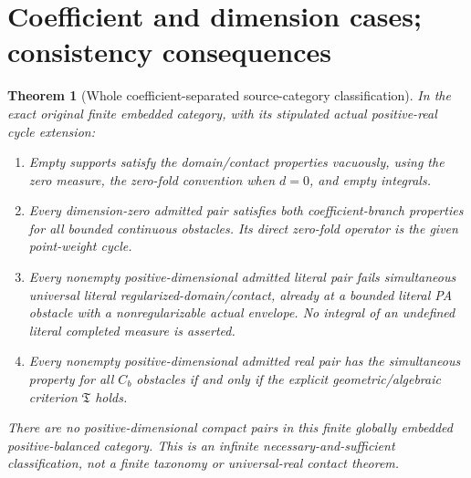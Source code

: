 \documentclass[11pt]{article}
\newtheorem{theorem}{Theorem}[section]
\begin{document}
\section{Coefficient and dimension cases; consistency consequences}
\begin{theorem}[Whole coefficient-separated source-category classification]\label{t:whole}
In the exact original finite embedded category, with its stipulated actual positive-real cycle extension:
\begin{enumerate}
\item Empty supports satisfy the domain/contact properties vacuously, using the zero measure, the zero-fold convention when $d=0$, and empty integrals.
\item Every dimension-zero admitted pair satisfies both coefficient-branch properties for all bounded continuous obstacles. Its direct zero-fold operator is the given point-weight cycle.
\item Every nonempty positive-dimensional admitted literal pair fails simultaneous universal literal regularized-domain/contact, already at a bounded literal PA obstacle with a nonregularizable actual envelope. No integral of an undefined literal completed measure is asserted.
\item Every nonempty positive-dimensional admitted real pair has the simultaneous property for \emph{all} $C_b$ obstacles if and only if the explicit geometric/algebraic criterion $\mathfrak T$ holds.
\end{enumerate}
There are no positive-dimensional compact pairs in this finite globally embedded positive-balanced category. This is an infinite necessary-and-sufficient classification, not a finite taxonomy or universal-real contact theorem.
\end{theorem}
\end{document}
